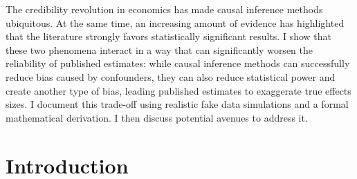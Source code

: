 \documentclass[usletter, 12pt]{article}
\begin{document}
		The credibility revolution in economics has made causal inference methods ubiquitous. At the same time, an increasing amount of evidence has highlighted that the literature strongly favors statistically significant results. I show that these two phenomena interact in a way that can significantly worsen the reliability of published estimates: while causal inference methods can successfully reduce bias caused by confounders, they can also reduce statistical power and create another type of bias, leading published estimates to exaggerate true effects sizes. I document this trade-off using realistic fake data simulations and a formal mathematical derivation. I then discuss potential avenues to address it. 
		
	
	
	
	\newpage
	


	
	\section{Introduction}
	
		
	
	



	
\end{document}

